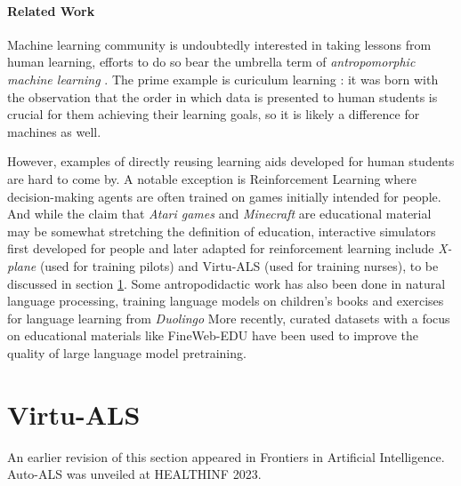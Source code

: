 \paragraph{Related Work}

Machine learning community is undoubtedly interested in taking lessons from human learning, efforts to do so bear the umbrella term of \emph{antropomorphic
machine learning} \cite{angelovAnthropomorphicMachineLearning2018}. The prime example is curiculum learning \cite{sovianyCurriculumLearningSurvey2022, zhouCurBenchCurriculumLearning2024}: it was born with the observation that the order in which data is presented to human students is crucial for them achieving their learning goals, so it is likely a difference for machines as well.

However, examples of directly reusing learning aids developed for human students are hard to come by. A notable exception is Reinforcement Learning where decision-making agents are often trained on games initially intended for people. And while the claim that \emph{Atari games} \cite{mnihPlayingAtariDeep2013} and 
\emph{Minecraft} \cite{hofmannMinecraftAIPlayground2019} are educational material may be somewhat stretching the definition of education, interactive simulators first developed for people and later adapted for reinforcement learning include \emph{X-plane} \cite{staudingerXPlaneMLEnvironmentLearning2018} (used for training pilots) and Virtu-ALS (used for training nurses), to be discussed in section \ref{sec:virtu-als}. 
Some antropodidactic work has also been done in natural language processing, training language models on children's books \cite{mayhewSimultaneousTranslationParaphrase2020} and exercises for language learning from \emph{Duolingo} \cite{mayhewSimultaneousTranslationParaphrase2020}
More recently, curated datasets with a focus on educational materials like FineWeb-EDU \cite{penedoFineWebDatasetsDecanting2024} have been used to improve the quality of large language model pretraining.

\newpage
\section{Virtu-ALS}
\label{sec:virtu-als}

\begin{remark}
  An earlier revision of this section \cite[section 3.1]{liventsevEffectivePatientSimulators2021} appeared in Frontiers in Artificial Intelligence. Auto-ALS \cite{liventsevVadim0x60Autoals2024} was unveiled at HEALTHINF 2023.
\end{remark}


